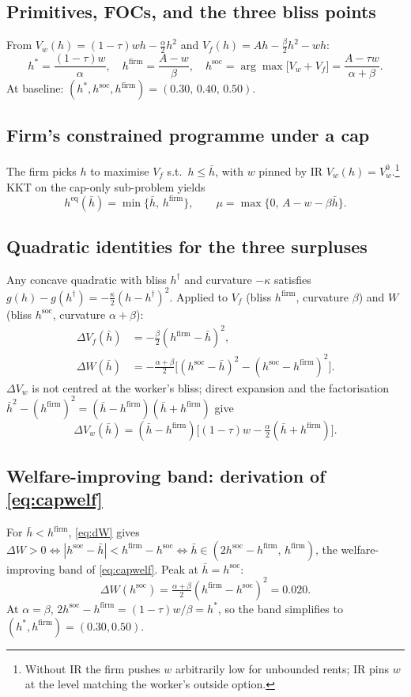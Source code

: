 \documentclass[a4paper,11pt]{article}
\begin{document}
\subsection{Primitives, FOCs, and the three bliss points}
From $V_w(h)=(1-\tau)wh-\tfrac{\alpha}{2}h^{2}$ and $V_f(h)=Ah-\tfrac{\beta}{2}h^{2}-wh$:
\[
h^{*}=\frac{(1-\tau)w}{\alpha},\quad h^{\mathrm{firm}}=\frac{A-w}{\beta},\quad h^{\mathrm{soc}}=\arg\max\bigl[V_w+V_f\bigr]=\frac{A-\tau w}{\alpha+\beta}.
\]
At baseline: $(h^{*},h^{\mathrm{soc}},h^{\mathrm{firm}})=(0.30,\,0.40,\,0.50)$.

\subsection{Firm's constrained programme under a cap}
The firm picks $h$ to maximise $V_f$ s.t.\ $h\le\bar h$, with $w$ pinned by IR $V_w(h)=V_w^{0}$.\footnote{Without IR the firm pushes $w$ arbitrarily low for unbounded rents; IR pins $w$ at the level matching the worker's outside option.} KKT on the cap-only sub-problem yields
\[
h^{\mathrm{eq}}(\bar h)=\min\{\bar h,\,h^{\mathrm{firm}}\},\qquad \mu=\max\{0,\,A-w-\beta\bar h\}.
\]

\subsection{Quadratic identities for the three surpluses}
Any concave quadratic with bliss $h^{\dagger}$ and curvature $-\kappa$ satisfies $g(h)-g(h^{\dagger})=-\tfrac{\kappa}{2}(h-h^{\dagger})^{2}$. Applied to $V_f$ (bliss $h^{\mathrm{firm}}$, curvature $\beta$) and $W$ (bliss $h^{\mathrm{soc}}$, curvature $\alpha+\beta$):
\begin{align}
\Delta V_f(\bar h) &= -\tfrac{\beta}{2}(h^{\mathrm{firm}}-\bar h)^{2}, \label{eq:dVf}\\
\Delta W(\bar h) &= -\tfrac{\alpha+\beta}{2}\bigl[(h^{\mathrm{soc}}-\bar h)^{2}-(h^{\mathrm{soc}}-h^{\mathrm{firm}})^{2}\bigr]. \label{eq:dW}
\end{align}
$\Delta V_w$ is not centred at the worker's bliss; direct expansion and the factorisation $\bar h^{2}-(h^{\mathrm{firm}})^{2}=(\bar h-h^{\mathrm{firm}})(\bar h+h^{\mathrm{firm}})$ give
\begin{equation}
\Delta V_w(\bar h)=(\bar h-h^{\mathrm{firm}})\bigl[(1-\tau)w-\tfrac{\alpha}{2}(\bar h+h^{\mathrm{firm}})\bigr]. \label{eq:dVw}
\end{equation}

\subsection{Welfare-improving band: derivation of \texorpdfstring{\eqref{eq:capwelf}}{Eq.\ (1)}}
For $\bar h<h^{\mathrm{firm}}$, \eqref{eq:dW} gives $\Delta W>0\iff |h^{\mathrm{soc}}-\bar h|<h^{\mathrm{firm}}-h^{\mathrm{soc}}\iff \bar h\in(2h^{\mathrm{soc}}-h^{\mathrm{firm}},\,h^{\mathrm{firm}})$, the welfare-improving band of \eqref{eq:capwelf}. Peak at $\bar h=h^{\mathrm{soc}}$:
\[
\Delta W(h^{\mathrm{soc}})=\tfrac{\alpha+\beta}{2}(h^{\mathrm{firm}}-h^{\mathrm{soc}})^{2}=0.020.
\]
At $\alpha=\beta$, $2h^{\mathrm{soc}}-h^{\mathrm{firm}}=(1-\tau)w/\beta=h^{*}$, so the band simplifies to $(h^{*},h^{\mathrm{firm}})=(0.30,0.50)$.
\end{document}
